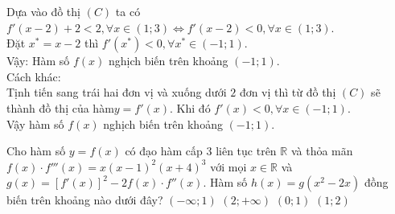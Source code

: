 \begin{ex}
{\begin{center}
\begin{tikzpicture}[scale=0.7,font=\footnotesize, line join=round, line cap=round, >=stealth]
			\end{tikzpicture}
		\end{center}
		Dựa vào đồ thị $(C)$ ta có\\
		$f'\left(x-2\right)+2<2,\forall x\in\left(1;3\right)\Leftrightarrow{f}'\left(x-2\right)<0,\forall x\in\left(1;3\right)$.\\
		Đặt $ x^*=x-2$ thì $f'\left(x^*\right)<0,\forall x^*\in\left(-1;1\right)$.\\
		Vậy: Hàm số $ f(x)$ nghịch biến trên khoảng $\left(-1;1\right)$.\\
		Cách khác:\\
		Tịnh tiến sang trái hai đơn vị và xuống dưới $2$ đơn vị thì từ đồ thị $(C)$ sẽ thành đồ thị của hàm$ y=f'(x)$. Khi đó $f'(x)<0,\forall x\in\left(-1;1\right)$.\\
		Vậy hàm số $ f(x)$ nghịch biến trên khoảng $\left(-1;1\right)$.}
\end{ex}

\begin{ex}%
	Cho hàm số $y=f(x)$ có đạo hàm cấp $ 3$ liên tục trên $\mathbb{R}$ và thỏa mãn $f(x)\cdot f'''(x)=x{\left(x-1\right)^2}{\left(x+4\right)^3}$ với mọi $x\in\mathbb{R}$ và $g(x)=\left[f'(x)\right]^2-2f(x)\cdot f''(x)$. Hàm số $h(x)=g\left(x^2-2x\right)$ đồng biến trên khoảng nào dưới đây?
	\choice
	{$\left(-\infty ;1\right)$}
	{$\left(2;+\infty\right)$}
	{$\left(0;1\right)$}
	{\True $\left(1;2\right)$}
\end{ex}

